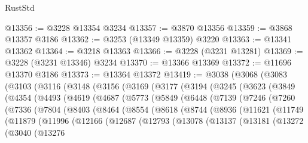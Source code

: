 \begin{lexlean}{RustStd}
\begin{coremodule}
@13356 := @3228 @13354 @3234
@13357 := @3870 @13356
@13359 := @3868 @13357 @3186
@13362 := @3253 (@13349 @13359) @3220
@13363 := @13341 @13362
@13364 := @3218 @13363
@13366 := @3228 (@3231 @13281)
@13369 := @3228 (@3231 @13346) @3234
@13370 := @13366 @13369
@13372 := @11696 @13370 @3186
@13373 := @13364 @13372
@13419 := @3038
    (@3068
      (@3083
        (@3103
          (@3116
            (@3148
              (@3156
                (@3169
                  (@3177
                    (@3194
                      (@3245
                        (@3623
                          (@3849
                            (@4354
                              (@4493
                                (@4619
                                  (@4687
                                    (@5773
                                      (@5849
                                        (@6448
                                          (@7139
                                            (@7246
                                              (@7260
                                                (@7336
                                                  (@7804
                                                    (@8403
                                                      (@8464
                                                        (@8554
                                                          (@8618
                                                            (@8744
                                                              (@8936
                                                                (@11621
                                                                  (@11749
                                                                    (@11879
                                                                      (@11996
                                                                        (@12166
                                                                          (@12687
                                                                            (@12793
                                                                              (@13078
                                                                                (@13137
                                                                                  (@13181
                                                                                    (@13272
                                                                                      (@3040
                                                                                        (@13276

\end{coremodule}
\end{lexlean}
